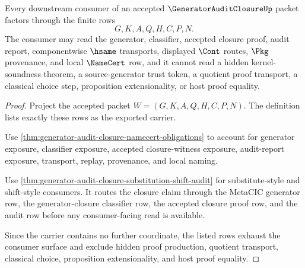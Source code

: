 \begin{theorem}
\label{thm:generator-audit-closure-nonescape}
Every downstream consumer of an accepted $\GeneratorAuditClosureUp$ packet factors through the finite rows
$$
G,K,A,Q,H,C,P,N.
$$
The consumer may read the generator, classifier, accepted closure proof, audit report, componentwise $\hsame$ transports, displayed $\Cont$ routes, $\Pkg$ provenance, and local $\NameCert$ row, and it cannot read a hidden kernel-soundness theorem, a source-generator trust token, a quotient proof transport, a classical choice step, proposition extensionality, or host proof equality.
\end{theorem}
\begin{proof}
Project the accepted packet $W=(G,K,A,Q,H,C,P,N)$. The definition lists exactly these rows as the exported carrier.

Use \autoref{thm:generator-audit-closure-namecert-obligations} to account for generator exposure, classifier exposure, accepted closure-witness exposure, audit-report exposure, transport, replay, provenance, and local naming.

Use \autoref{thm:generator-audit-closure-substitution-shift-audit} for substitute-style and shift-style consumers. It routes the closure claim through the MetaCIC generator row, the generator-closure classifier row, the accepted closure proof row, and the audit row before any consumer-facing read is available.

Since the carrier contains no further coordinate, the listed rows exhaust the consumer surface and exclude hidden proof production, quotient transport, classical choice, proposition extensionality, and host proof equality.
\end{proof}


